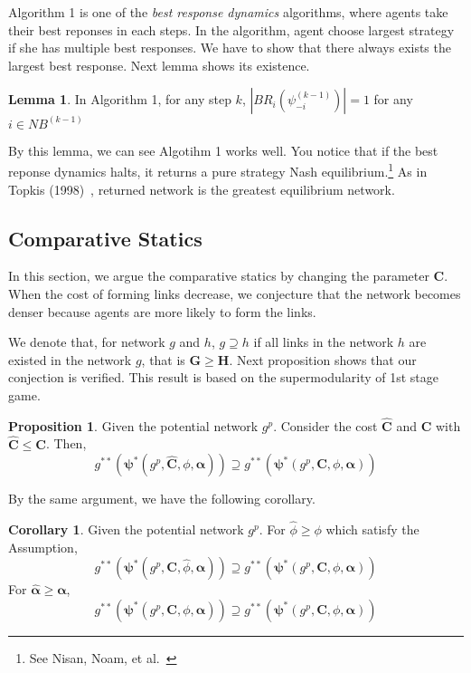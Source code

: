 \documentclass[12pt]{article}
\theoremstyle{definition}
\newtheorem{lemma}{Lemma}
\newtheorem{proposition}{Proposition}
\newtheorem{corollary}{Corollary}
\newcommand{\bm}[1]{\boldsymbol{#1}}
\begin{document}
Algorithm 1 is one of the {\it{best response dynamics}} algorithms, where agents take their best reponses in each steps.
In the algorithm, agent choose largest strategy if she has multiple best responses.
We have to show that there always exists the largest best response.
Next lemma shows its existence.

\begin{lemma}
In Algorithm 1, for any step $k$, $|BR_i(\psi_{-i}^{(k-1)})| = 1$ for any $i \in NB^{(k-1)}$
\end{lemma}

By this lemma, we can see Algotihm 1 works well.
You notice that if the best reponse dynamics halts, it returns a pure strategy Nash equilibrium.\footnote{See Nisan, Noam, et al.~\cite{AGT}}
As in Topkis (1998)~\cite{topkis1998}, returned network is the greatest equilibrium network.


\subsection{Comparative Statics}

In this section, we argue the comparative statics by changing the parameter $\bm{C}$.
When the cost of forming links decrease, we conjecture that the network becomes denser because agents are more likely to form the links.

We denote that, for network $g$ and $h$, $g \supseteq h$ if all links in the network $h$ are existed in the network $g$, that is $\bm{G} \ge \bm{H}$.
Next proposition shows that our conjection is verified.
This result is based on the supermodularity of 1st stage game.

\begin{proposition}
Given the potential network $g^p$.
Consider the cost $\bm{\hat{C}}$ and $\bm{C}$ with $\bm{\hat{C}} \le \bm{C}$.
Then,
\[ g^{**}(\bm{\psi}^*(g^p, \bm{\hat{C}}, \phi, \bm{\alpha})) \supseteq g^{**}(\bm{\psi}^*(g^p, \bm{C}, \phi, \bm{\alpha})) \]
\end{proposition}

By the same argument, we have the following corollary.

\begin{corollary}
	Given the potential network $g^p$. For $\hat{\phi} \ge \phi$ which satisfy the Assumption,
        \[ g^{**}(\bm{\psi}^*(g^p, \bm{C}, \hat{\phi}, \bm{\alpha})) \supseteq g^{**}(\bm{\psi}^*(g^p, \bm{C}, \phi, \bm{\alpha})) \]
    For $\bm{\hat{\alpha}} \ge \bm{\alpha}$,
        \[ g^{**}(\bm{\psi}^*(g^p, \bm{C}, \phi, \bm{\hat{\alpha}})) \supseteq g^{**}(\bm{\psi}^*(g^p, \bm{C}, \phi, \bm{\alpha})) \]
\end{corollary}
\end{document}
